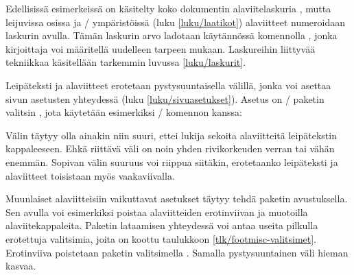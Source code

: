 Edellisissä esimerkeissä on käsitelty koko dokumentin alaviitelaskuria
, mutta leijuvissa osissa ja \-/
ympäristöissä (luku \ref{luku/laatikot}) alaviitteet numeroidaan
laskurin  avulla. Tämän laskurin arvo ladotaan
käytännössä komennolla , jonka kirjoittaja voi
määritellä uudelleen tarpeen mukaan. Laskureihin liittyvää tekniikkaa
käsitellään tarkemmin luvussa \ref{luku/laskurit}.

Leipäteksti ja alaviitteet erotetaan pystysuuntaisella välillä, jonka
voi asettaa sivun asetusten yhteydessä (luku \ref{luku/sivuasetukset}).
Asetus on \-/ paketin valitsin ,
jota käytetään esimerkiksi \-/ komennon kanssa:

\begin{koodilohkosis}
\geometry{ footnotesep=14bp }
\end{koodilohkosis}

Välin täytyy olla ainakin niin suuri, ettei lukija sekoita alaviitteitä
leipätekstin kappaleeseen. Ehkä riittävä väli on noin yhden
rivikorkeuden verran tai vähän enemmän. Sopivan välin suuruus voi
riippua siitäkin, erotetaanko leipäteksti ja alaviitteet toisistaan myös
vaakaviivalla.

Muunlaiset alaviitteisiin vaikuttavat asetukset täytyy tehdä paketin
 avustuksella. Sen avulla voi
esimerkiksi poistaa alaviitteiden erotinviivan ja muotoilla
alaviitekappaleita. Paketin lataamisen yhteydessä voi antaa useita
pilkulla erotettuja valitsimia, joita on koottu taulukkoon
\ref{tlk/footmisc-valitsimet}. Erotinviiva poistetaan paketin
valitsimella . Samalla pystysuuntainen väli hieman kasvaa.


